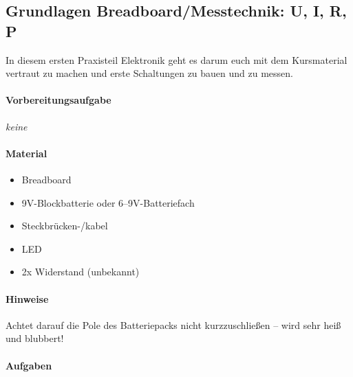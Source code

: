 \clearpage

\subsection{Grundlagen Breadboard/Messtechnik: U, I, R, P}

In diesem ersten Praxisteil Elektronik geht es darum euch mit dem Kursmaterial
vertraut zu machen und erste Schaltungen zu bauen und zu messen.


\paragraph{Vorbereitungsaufgabe}

\emph{keine}

\paragraph{Material}

\begin{itemize}
    \item Breadboard
    \item 9V-Blockbatterie oder 6--9V-Batteriefach
    \item Steckbrücken-/kabel
    \item LED
    \item 2x Widerstand (unbekannt) 
\end{itemize}

\paragraph{Hinweise}

Achtet darauf die Pole des Batteriepacks nicht kurzzuschließen -- wird sehr heiß
und blubbert!

\paragraph{Aufgaben}

